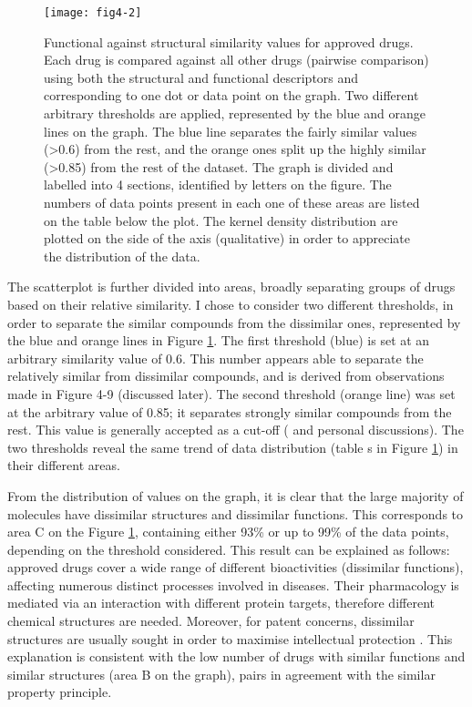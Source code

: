 \begin{figure}[H]
    \centering
    \texttt{[image: fig4-2]}
    \caption{Functional against structural similarity values for approved drugs. Each drug is compared against all other drugs (pairwise comparison) using both the structural and functional descriptors and corresponding to one dot or data point on the graph. Two different arbitrary thresholds are applied, represented by the blue and orange lines on the graph. The blue line separates the fairly similar values (\textgreater 0.6) from the rest, and the orange ones split up the highly similar (\textgreater 0.85) from the rest of the dataset. The graph is divided and labelled into 4 sections, identified by letters on the figure. The numbers of data points present in each one of these areas are listed on the table below the plot. The kernel density distribution are plotted on the side of the axis (qualitative) in order to appreciate the distribution of the data.}
    \label{fig4-2}
\end{figure}

The scatterplot is further divided into areas, broadly separating groups of drugs based on their relative similarity. I chose to consider two different thresholds, in order to separate the similar compounds from the dissimilar ones, represented by the blue and orange lines in Figure \ref{fig4-2}. The first threshold (blue) is set at an arbitrary similarity value of 0.6. This number appears able to separate the relatively similar from dissimilar compounds, and is derived from observations made in Figure 4-9 (discussed later). The second threshold (orange line) was set at the arbitrary value of 0.85; it separates strongly similar compounds from the rest. This value is generally accepted as a cut-off (\cite{chemsimwiki} and personal discussions). The two thresholds reveal the same trend of data distribution (table s in Figure \ref{fig4-2}) in their different areas.

From the distribution of values on the graph, it is clear that the large majority of molecules have dissimilar structures and dissimilar functions. This corresponds to area C on the Figure \ref{fig4-2}, containing either 93\% or up to 99\% of the data points, depending on the threshold considered. This result can be explained as follows: approved drugs cover a wide range of different bioactivities (dissimilar functions), affecting numerous distinct processes involved in diseases. Their pharmacology is mediated via an interaction with different protein targets, therefore different chemical structures are needed. Moreover, for patent concerns, dissimilar structures are usually sought in order to maximise intellectual protection \citep{barratt2012drug}. This explanation is consistent with the low number of drugs with similar functions and similar structures (area B on the graph), pairs in agreement with the similar property principle.

